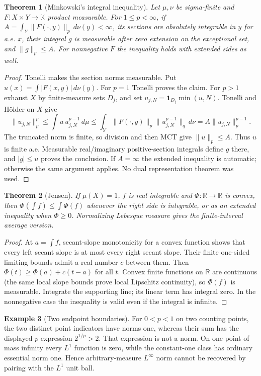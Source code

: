 \documentclass[11pt,oneside,openany]{book}
\newtheorem{theorem}{Theorem}[chapter]
\theoremstyle{definition}
\newtheorem{example}[theorem]{Example}
\theoremstyle{remark}
\newcommand{\R}{\mathbb R}\newcommand{\C}{\mathbb C}
\newcommand{\one}{\mathbf1}\newcommand{\ind}[1]{\mathbf1_{#1}}
\newcommand{\family}[1]{}
\begin{document}
\begin{theorem}[Minkowski's integral inequality]\family{D11.10.minkowski_integral}\label{d11:10:minkowski-integral}
Let $\mu,\nu$ be sigma-finite and $F:X\times Y\to\mathbb K$ product
measurable. For $1\leq p<\infty$, if
$A=\int_Y\|F(\cdot,y)\|_p\,d\nu(y)<\infty$, its sections are
absolutely integrable in $y$ for a.e. $x$, their integral $g$ is measurable
after zero extension on the exceptional set, and $\|g\|_p\leq A$.
For nonnegative $F$ the inequality holds with extended sides as well.
\end{theorem}
\begin{proof}
Tonelli makes the section norms measurable. Put
$u(x)=\int|F(x,y)|\,d\nu(y)$. For $p=1$ Tonelli proves the claim.
For $p>1$ exhaust $X$ by finite-measure sets $D_j$, and set
$u_{j,N}=\one_{D_j}\min(u,N)$. Tonelli and H\"older on $X$ give
\[
 \|u_{j,N}\|_p^p\leq\int u\,u_{j,N}^{p-1}\,d\mu
 \leq\int_Y\|F(\cdot,y)\|_p
       \|u_{j,N}^{p-1}\|_q\,d\nu
 =A\|u_{j,N}\|_p^{p-1}.
\]
The truncated norm is finite, so division and then MCT give $\|u\|_p\leq A$.
Thus $u$ is finite a.e. Measurable real/imaginary positive-section integrals
define $g$ there, and $|g|\leq u$ proves the conclusion. If $A=\infty$
the extended inequality is automatic; otherwise the same argument applies.
No dual representation theorem was used.
\end{proof}

\begin{theorem}[Jensen]\family{D11.10.jensen}\label{d11:10:jensen}
If $\mu(X)=1$, $f$ is real integrable and $\Phi:\R\to\R$ is convex,
then $\Phi(\int f)\leq\int\Phi(f)$ whenever the right side is integrable,
or as an extended inequality when $\Phi\geq0$. Normalizing Lebesgue
measure gives the finite-interval average version.
\end{theorem}
\begin{proof}
At $a=\int f$, secant-slope monotonicity for a convex function shows that
every left secant slope is at most every right secant slope. Their finite
one-sided limiting bounds admit a real number $c$ between them.
Then $\Phi(t)\geq\Phi(a)+c(t-a)$ for all $t$. Convex finite functions
on $\R$ are continuous (the same local slope bounds prove local
Lipschitz continuity), so $\Phi(f)$ is measurable. Integrate the supporting
line; its linear term has integral zero. In the nonnegative case the
inequality is valid even if the integral is infinite.
\end{proof}

\begin{example}[Two endpoint boundaries]\family{D11.10.c0p_boundary}\label{d11:10:c0p-boundary}
For $0<p<1$ on two counting points, the two distinct point indicators have
norms one, whereas their sum has the displayed $p$-expression $2^{1/p}>2$.
That expression is not a norm. On one point of mass infinity every $L^1$
function is zero, while the constant-one class has ordinary essential norm
one. Hence arbitrary-measure $L^\infty$ norm cannot be recovered by pairing
with the $L^1$ unit ball.
\end{example}
\end{document}
